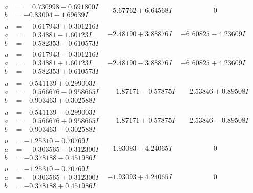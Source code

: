 \documentclass[1p]{elsarticle_modified}
\theoremstyle{definition}
\begin{document}
$$\begin{array}{c|c|c}
\begin{aligned}
a &= \phantom{-}0.730998 - 0.691800 I \\
b &= -0.83004 - 1.69639 I\end{aligned}
 & -5.67762 + 6.64568 I & \phantom{-0.000000 } 0 \\ \hline\begin{aligned}
u &= \phantom{-}0.617943 + 0.301216 I \\
a &= \phantom{-}0.34881 - 1.60123 I \\
b &= \phantom{-}0.582353 - 0.610573 I\end{aligned}
 & -2.48190 + 3.88876 I & -6.60825 - 4.23609 I \\ \hline\begin{aligned}
u &= \phantom{-}0.617943 - 0.301216 I \\
a &= \phantom{-}0.34881 + 1.60123 I \\
b &= \phantom{-}0.582353 + 0.610573 I\end{aligned}
 & -2.48190 - 3.88876 I & -6.60825 + 4.23609 I \\ \hline\begin{aligned}
u &= -0.541139 + 0.299003 I \\
a &= \phantom{-}0.566676 - 0.958665 I \\
b &= -0.903463 + 0.302588 I\end{aligned}
 & \phantom{-}1.87171 - 0.57875 I & \phantom{-}2.53846 + 0.89508 I \\ \hline\begin{aligned}
u &= -0.541139 - 0.299003 I \\
a &= \phantom{-}0.566676 + 0.958665 I \\
b &= -0.903463 - 0.302588 I\end{aligned}
 & \phantom{-}1.87171 + 0.57875 I & \phantom{-}2.53846 - 0.89508 I \\ \hline\begin{aligned}
u &= -1.25310 + 0.70769 I \\
a &= \phantom{-}0.303565 - 0.312300 I \\
b &= -0.378188 - 0.451986 I\end{aligned}
 & -1.93093 - 4.24065 I & \phantom{-0.000000 } 0 \\ \hline\begin{aligned}
u &= -1.25310 - 0.70769 I \\
a &= \phantom{-}0.303565 + 0.312300 I \\
b &= -0.378188 + 0.451986 I\end{aligned}
 & -1.93093 + 4.24065 I & \phantom{-0.000000 } 0 \\ \hline\begin{aligned}

\end{aligned}
\end{array}$$
\end{document}
